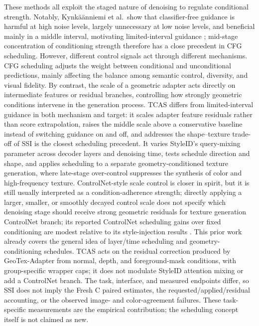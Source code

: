 \documentclass[times,twocolumn,final]{elsarticle}
\providecommand{\DIFadd}[1]{{\protect\color{blue} \sf #1}} %
\providecommand{\DIFdel}[1]{{\protect\color{red} \scriptsize #1}} %
\providecommand{\DIFaddbegin}{} %
\providecommand{\DIFaddend}{} %
\providecommand{\DIFdelbegin}{} %
\providecommand{\DIFdelend}{} %
\begin{document}
\DIFdelbegin \DIFdel{These methods all exploit the staged nature of denoising to regulate conditional strength. Notably, Kynk\"a\"anniemi et al.\ show that classifier-free guidance is harmful at high noise levels, largely unnecessary at low noise levels, and beneficial mainly in a middle interval, motivating limited-interval guidance \cite{kynkanniemi2024limited}; mid-stage concentration of conditioning strength therefore has a close precedent in CFG scheduling. However, different control signals act through different mechanisms. CFG scheduling adjusts the weight between conditional and unconditional predictions, mainly affecting the balance among semantic control, diversity, and visual fidelity. By contrast, the scale of a geometric adapter acts directly on intermediate features or residual branches, controlling how strongly geometric conditions intervene in the generation process. TCAS differs from limited-interval guidance in both mechanism and target: it scales adapter feature residuals rather than score extrapolation, raises the middle scale above a conservative baseline instead of switching guidance on and off, and addresses the shape--texture trade-off of }\DIFdelend \DIFaddbegin \DIFadd{SSI is the closest scheduling precedent. It varies StyleID's query-mixing parameter across decoder layers and denoising time, tests schedule direction and shape, and applies scheduling to a separate }\DIFaddend geometry-conditioned \DIFdelbegin \DIFdel{texture generation, where late-stage over-control suppresses the synthesis of color and high-frequency texture. ControlNet-style scale control is closer in spirit, but it is still usually interpreted as a condition-adherence strength; directly applying a larger, smaller, or smoothly decayed control scale does not specify which denoising stage should receive strong geometric residuals for texture generation}\DIFdelend \DIFaddbegin \DIFadd{ControlNet branch; its reported ControlNet scheduling gains over fixed conditioning are modest relative to its style-injection results \cite{kulkarni2026ssi}. This prior work already covers the general idea of layer/time scheduling and geometry-conditioning schedules. TCAS acts on the residual correction produced by GeoTex-Adapter from normal, depth, and foreground-mask conditions, with group-specific wrapper caps; it does not modulate StyleID attention mixing or add a ControlNet branch. The task, interface, and measured endpoints differ, so SSI does not imply the Fresh C paired estimates, the requested/applied/residual accounting, or the observed image- and color-agreement failures. These task-specific measurements are the empirical contribution; the scheduling concept itself is not claimed as new}\DIFaddend .
\end{document}

